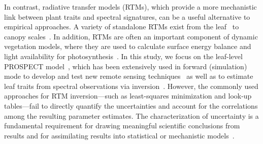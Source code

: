 In contrast, radiative transfer models (RTMs), which provide a more mechanistic link between plant traits and spectral signatures, can be a useful alternative to empirical approaches.
A variety of standalone RTMs exist from the leaf~\cite{dawson_1998_liberty,feret_2008_prospect,ganapol_1998} to canopy scales~\cite{jacquemoud_2009_prospect,kuusk_2001_journal,verhoef_1984_sail,wang_2013_canopy}.
In addition, RTMs are often an important component of dynamic vegetation models, where they are used to calculate surface energy balance and light availability for photosynthesis~\cite{medvigy_2009_mechanistic,nimeister_2010_clumped,kobayashi_2012_modeling}.
In this study, we focus on the leaf-level PROSPECT model~\cite{jacquemoud_1990_prospect,feret_2008_prospect}, which has been extensively used in forward (simulation) mode to develop and test new remote sensing techniques~\cite{croft_2014_applicability,feret_2011_optimizing,lemaire_2004_towards,zarco_tejada_2013_estimating}
as well as to estimate leaf traits from spectral observations via inversion~\cite{atzberger_2012_spatially,feret_2008_prospect,jacquemoud_1995_extraction,jacquemoud_2009_prospect,li_2013_retrieval,li_2011_retrieval,zarco_tejada_2004_needle}.
However, the commonly used approaches for RTM inversion—such as least-squares minimization and look-up tables—fail to directly quantify the uncertainties and account for the correlations among the resulting parameter estimates.
The characterization of uncertainty is a fundamental requirement for drawing meaningful scientific conclusions from results and for assimilating results into statistical or mechanistic models~\cite{cressie_accounting_2009,quaife_2008_assimilating}.

